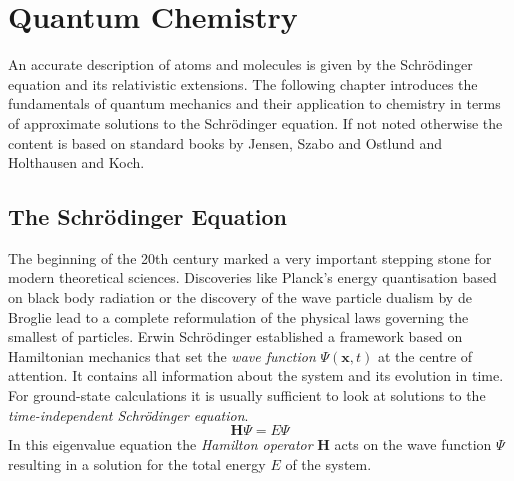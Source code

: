 \chapter{Quantum Chemistry}
\label{sec:basicsofQC}

An accurate description of atoms and molecules is given by the
Schr\"odinger equation and its relativistic extensions. The following chapter introduces the fundamentals of
quantum mechanics and their application to chemistry in terms of approximate
solutions to the Schr\"odinger equation. If not noted otherwise the content is
based on standard books by
Jensen\autocite{Jensen_IntroductionComputationalChemistry_2007}, Szabo and
Ostlund\autocite{Szabo_ModernQuantumChemistry_1996} and Holthausen and
Koch\autocite{Koch_ChemistGuideDensity_2001}.

\section{The Schr\"odinger Equation}
\label{sec:schrodingerequation}

The beginning of the 20th century marked a very important stepping stone for
modern theoretical sciences. Discoveries like Planck's energy quantisation
based on black body
radiation\autocite{Planck_UeberGesetzEnergieverteilung_1901} or the discovery
of the wave particle dualism by de
Broglie\autocite{Broglie_RecherchestheorieQuanta_1925} lead to a complete
reformulation of the physical laws governing the smallest of particles. Erwin
Schr\"odinger established a framework based on Hamiltonian mechanics that set
the \textit{wave function} $\Psi(\mathbf{x},t)$ at the centre of
attention.\autocite{Schrodinger_QuantisierungalsEigenwertproblem_1926} It
contains all information about the system and its evolution in time. For
ground-state calculations it is usually sufficient to look at solutions to the
\textit{time-independent Schr\"odinger equation}.
%
\begin{equation}
	\mathbf{H}\Psi=E\Psi\label{eqn:SchrodingerEquation}
\end{equation}%
%
In this eigenvalue equation the \textit{Hamilton operator} $\mathbf{H}$ acts on
the wave function $\Psi$ resulting in a solution for the total energy $E$ of the
system. 

